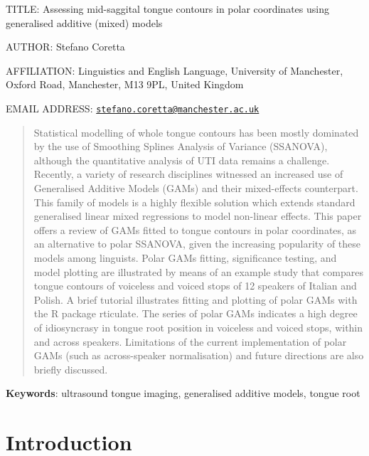 \documentclass[11pt,]{article}
\title{}
\author{}
\date{}
\begin{document}
\large

TITLE: Assessing mid-saggital tongue contours in polar coordinates using
generalised additive (mixed) models

\vspace{1cm}

AUTHOR: Stefano Coretta

\vspace{1cm}

AFFILIATION: Linguistics and English Language, University of Manchester,
Oxford Road, Manchester, M13 9PL, United Kingdom

\vspace{1cm}

EMAIL ADDRESS:
\href{mailto:stefano.coretta@manchester.ac.uk}{\nolinkurl{stefano.coretta@manchester.ac.uk}}

\normalsize

\pagebreak

\begin{abstract}
Statistical modelling of whole tongue contours has been mostly dominated by the use of Smoothing Splines Analysis of Variance (SSANOVA), although the quantitative analysis of UTI data remains a challenge.
Recently, a variety of research disciplines witnessed an increased use of Generalised Additive Models (GAMs) and their mixed-effects counterpart.
This family of models is a highly flexible solution which extends standard generalised linear mixed regressions to model non-linear effects.
This paper offers a review of GAMs fitted to tongue contours in polar coordinates, as an alternative to polar SSANOVA, given the increasing popularity of these models among linguists.
Polar GAMs fitting, significance testing, and model plotting are illustrated by means of an example study that compares tongue contours of voiceless and voiced stops of 12 speakers of Italian and Polish.
A brief tutorial illustrates fitting and plotting of polar GAMs with the R package rticulate.
The series of polar GAMs indicates a high degree of idiosyncrasy in tongue root position in voiceless and voiced stops, within and across speakers.
Limitations of the current implementation of polar GAMs (such as across-speaker normalisation) and future directions are also briefly discussed.
\end{abstract}

\textbf{Keywords}: ultrasound tongue imaging, generalised additive
models, tongue root

\hypertarget{introduction}{%
\section{Introduction}\label{introduction}}
\end{document}
